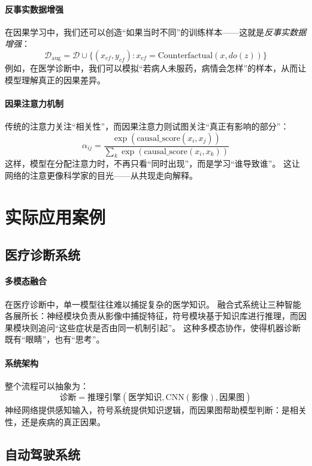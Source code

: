\paragraph{反事实数据增强}
在因果学习中，我们还可以创造“如果当时不同”的训练样本——这就是\emph{反事实数据增强}：  
$$\mathcal{D}_{\text{aug}} = \mathcal{D} \cup \{(x_{cf}, y_{cf}) : x_{cf} = \text{Counterfactual}(x, do(z))\}$$
例如，在医学诊断中，我们可以模拟“若病人未服药，病情会怎样”的样本，从而让模型理解真正的因果差异。

\paragraph{因果注意力机制}
传统的注意力关注“相关性”，而因果注意力则试图关注“真正有影响的部分”：  
$$\alpha_{ij} = \frac{\exp(\text{causal\_score}(x_i, x_j))}{\sum_{k} \exp(\text{causal\_score}(x_i, x_k))}$$
这样，模型在分配注意力时，不再只看“同时出现”，而是学习“谁导致谁”。  
这让网络的注意更像科学家的目光——从共现走向解释。

\section{实际应用案例}

\subsection{医疗诊断系统}

\paragraph{多模态融合}
在医疗诊断中，单一模型往往难以捕捉复杂的医学知识。  
融合式系统让三种智能各展所长：神经模块负责从影像中捕捉特征，符号模块基于知识库进行推理，而因果模块则追问“这些症状是否由同一机制引起”。  
这种多模态协作，使得机器诊断既有“眼睛”，也有“思考”。

\paragraph{系统架构}
整个流程可以抽象为：  
$$\text{诊断} = \text{推理引擎}(\text{医学知识}, \text{CNN}(\text{影像}), \text{因果图})$$
神经网络提供感知输入，符号系统提供知识逻辑，而因果图帮助模型判断：是相关性，还是疾病的真正因果。

\subsection{自动驾驶系统}

